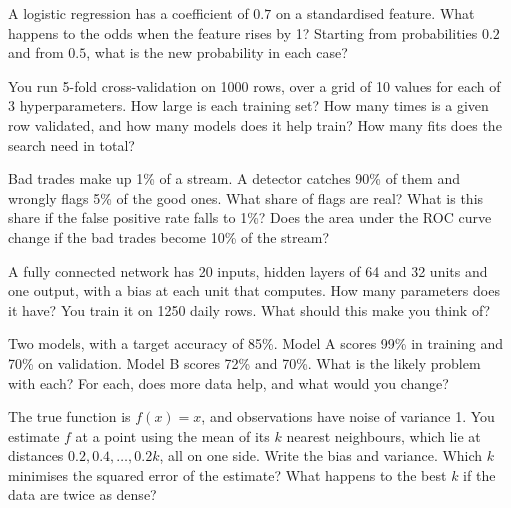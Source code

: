 \begin{question}\label{iq:iv1:machine-learning:5}
A logistic regression has a coefficient of $0.7$ on a standardised feature. What happens to the odds when the feature rises by 1? Starting from probabilities $0.2$ and from $0.5$, what is the new probability in each case?
\end{question}

\begin{question}\label{iq:iv1:machine-learning:6}
You run 5-fold cross-validation on 1000 rows, over a grid of 10 values for each of 3 hyperparameters. How large is each training set? How many times is a given row validated, and how many models does it help train? How many fits does the search need in total?
\end{question}

\begin{question}\label{iq:iv1:machine-learning:7}
Bad trades make up 1\% of a stream. A detector catches 90\% of them and wrongly flags 5\% of the good ones. What share of flags are real? What is this share if the false positive rate falls to 1\%? Does the area under the ROC curve change if the bad trades become 10\% of the stream?
\end{question}

\begin{question}\label{iq:iv1:machine-learning:8}
A fully connected network has 20 inputs, hidden layers of 64 and 32 units and one output, with a bias at each unit that computes. How many parameters does it have? You train it on 1250 daily rows. What should this make you think of?
\end{question}

\begin{question}\label{iq:iv1:machine-learning:9}
Two models, with a target accuracy of 85\%. Model A scores 99\% in training and 70\% on validation. Model B scores 72\% and 70\%. What is the likely problem with each? For each, does more data help, and what would you change?
\end{question}

\begin{question}\label{iq:iv1:machine-learning:10}
The true function is $f(x) = x$, and observations have noise of variance 1. You estimate $f$ at a point using the mean of its $k$ nearest neighbours, which lie at distances $0.2, 0.4, \dots, 0.2k$, all on one side. Write the bias and variance. Which $k$ minimises the squared error of the estimate? What happens to the best $k$ if the data are twice as dense?
\end{question}

